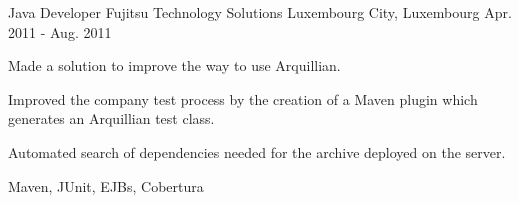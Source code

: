 \begin{cventries}
  \cventry
    {Java Developer} %
    {Fujitsu Technology Solutions} %
    {Luxembourg City, Luxembourg} %
    {Apr. 2011 - Aug. 2011} %
    {
      \begin{cvitems} %
        	\item Made a solution to improve the way to use Arquillian.
		\item Improved the company test process by the creation of a Maven plugin which generates an Arquillian test class.
		\item Automated search of dependencies needed for the archive deployed on the server.
      \end{cvitems}
    }
    {Maven, JUnit, EJBs, Cobertura}

\end{cventries}
